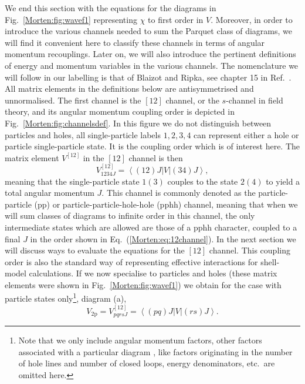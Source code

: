 We end this section with the equations for the diagrams
in Fig.~\ref{Morten:fig:wavef1} representing $\chi$ to first order in $V$.
Moreover, in order to introduce the various channels needed to sum the 
Parquet class of diagrams, we will find it convenient here to
classify these channels in terms of angular momentum 
recouplings. Later on, we will also introduce the pertinent
definitions of energy and momentum variables in the various channels.
The nomenclature we will follow in our labelling is that
of Blaizot and Ripka, see  chapter 15 in Ref.~.
All matrix elements in the definitions below 
are antisymmetrised and unnormalised.
The first channel is the $[12]$ channel, or the $s$-channel
in field theory, and its angular momentum coupling order
is depicted in Fig.~\ref{Morten:fig:channelsdef}. 
In this figure 
we do not distinguish between particles and holes, all single-particle
labels $1,2,3,4$ can represent either a hole or particle
single-particle state. It is the coupling order which is
of interest here.  
The matrix element $V^{[12]}$ in the $[12]$ channel is then 
\begin{equation}
       V_{1234J}^{[12]}
       =\left\langle (12)J\right | V
       \left | (34)J\right\rangle,
       \label{Morten:eq:12channel}
\end{equation} 
meaning that the single-particle state $1(3)$ couples to the state
$2(4)$ to yield a total angular momentum $J$. 
This channel is commonly denoted as the particle-particle (pp)
or particle-particle-hole-hole (pphh) channel, meaning that when
we will sum classes of diagrams to infinite order in this channel, the only
intermediate states which are allowed are those of a pphh character,
coupled to a final $J$ in the order shown in Eq.~(\ref{Morten:eq:12channel}).
In the next section we will  discuss ways to evaluate
the equations for the $[12]$ channel. 
This coupling order is also the standard way of representing
effective interactions for shell-model
calculations.
If we now specialise to particles and holes (these matrix 
elements were shown in Fig.~\ref{Morten:fig:wavef1}) we obtain for the case  
with particle states only\footnote{Note that we only 
include angular momentum factors,
other factors associated with a particular diagram
\cite{Morten:kstop81}, like factors originating in the
number of hole lines and number of closed loops, energy denominators,
etc.\ are omitted here.}, diagram (a),
\begin{equation}
      V_{\mathrm{2p}}=V_{pqrs J}^{[12]}=
       \left\langle (pq)J\right | V\left | (rs)J\right\rangle.
       \label{Morten:eq:2pv}
\end{equation}
